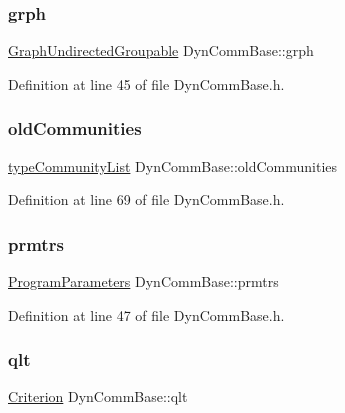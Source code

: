 \subsubsection{\texorpdfstring{grph}{grph}}
{\footnotesize\ttfamily \hyperlink{classGraphUndirectedGroupable}{Graph\+Undirected\+Groupable} Dyn\+Comm\+Base\+::grph\hspace{0.3cm}{\ttfamily [private]}}



Definition at line 45 of file Dyn\+Comm\+Base.\+h.

\mbox{\label{classDynCommBase_ac8cd68d0bff480bc59878668369aa2a5}} 
\subsubsection{\texorpdfstring{old\+Communities}{oldCommunities}}
{\footnotesize\ttfamily \hyperlink{graphUndirectedGroupable_8h_a8d8ff0ef0315e7cd3b62e467487cd0e1}{type\+Community\+List} Dyn\+Comm\+Base\+::old\+Communities\hspace{0.3cm}{\ttfamily [private]}}



Definition at line 69 of file Dyn\+Comm\+Base.\+h.

\mbox{\label{classDynCommBase_a61a92fd07b37a8153fda9cfebd779dc4}} 
\subsubsection{\texorpdfstring{prmtrs}{prmtrs}}
{\footnotesize\ttfamily \hyperlink{structProgramParameters}{Program\+Parameters} Dyn\+Comm\+Base\+::prmtrs\hspace{0.3cm}{\ttfamily [private]}}



Definition at line 47 of file Dyn\+Comm\+Base.\+h.

\mbox{\label{classDynCommBase_a6de9b4c868b4b8ca2923db6f6b1f08f7}} 
\subsubsection{\texorpdfstring{qlt}{qlt}}
{\footnotesize\ttfamily \hyperlink{classCriterion}{Criterion} Dyn\+Comm\+Base\+::qlt\hspace{0.3cm}{\ttfamily [private]}}



